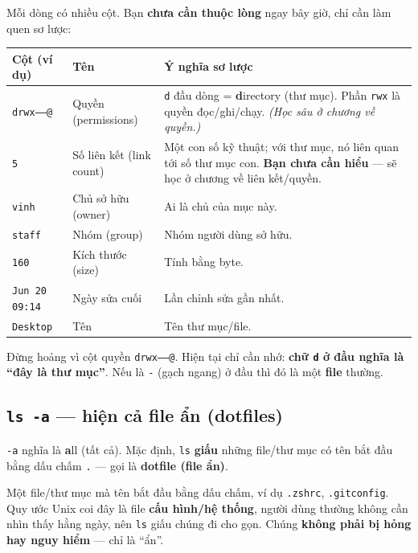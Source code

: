 \documentclass[12pt,a4paper]{article}
\begin{document}
Mỗi dòng có nhiều cột. Bạn \textbf{chưa cần thuộc lòng} ngay bây giờ, chỉ cần làm quen sơ lược:

\renewcommand{\arraystretch}{1.4}
\begin{longtable}{>{\raggedright\arraybackslash}p{2.6cm} >{\raggedright\arraybackslash}p{3.2cm} >{\raggedright\arraybackslash}p{7.6cm}}
\rowcolor{checkback}
\textbf{Cột (ví dụ)} & \textbf{Tên} & \textbf{Ý nghĩa sơ lược} \\
\hline
\endhead
\texttt{drwx------@} & Quyền (permissions) & \texttt{d} đầu dòng = \textbf{d}irectory (thư mục). Phần \texttt{rwx} là quyền đọc/ghi/chạy. \textit{(Học sâu ở chương về quyền.)} \\
\texttt{5} & Số liên kết (link count) & Một con số kỹ thuật; với thư mục, nó liên quan tới số thư mục con. \textbf{Bạn chưa cần hiểu} --- sẽ học ở chương về liên kết/quyền. \\
\texttt{vinh} & Chủ sở hữu (owner) & Ai là chủ của mục này. \\
\texttt{staff} & Nhóm (group) & Nhóm người dùng sở hữu. \\
\texttt{160} & Kích thước (size) & Tính bằng byte. \\
\texttt{Jun 20 09:14} & Ngày sửa cuối & Lần chỉnh sửa gần nhất. \\
\texttt{Desktop} & Tên & Tên thư mục/file. \\
\end{longtable}
\renewcommand{\arraystretch}{1}

\begin{notebox}
Đừng hoảng vì cột quyền \texttt{drwx------@}. Hiện tại chỉ cần nhớ: \textbf{chữ \texttt{d} ở đầu nghĩa là ``đây là thư mục''}. Nếu là \texttt{-} (gạch ngang) ở đầu thì đó là một \textbf{file} thường.
\end{notebox}

\subsection{\texttt{ls -a} --- hiện cả file ẩn (dotfiles)}

\texttt{-a} nghĩa là \textbf{a}ll (tất cả). Mặc định, \texttt{ls} \textbf{giấu} những file/thư mục có tên bắt đầu bằng dấu chấm \texttt{.} --- gọi là \textbf{dotfile (file ẩn)}.

\begin{notebox}[title={Thuật ngữ --- dotfile}]
Một file/thư mục mà tên bắt đầu bằng dấu chấm, ví dụ \texttt{.zshrc}, \texttt{.gitconfig}. Quy ước Unix coi đây là file \textbf{cấu hình/hệ thống}, người dùng thường không cần nhìn thấy hằng ngày, nên \texttt{ls} giấu chúng đi cho gọn. Chúng \textbf{không phải bị hỏng hay nguy hiểm} --- chỉ là ``ẩn''.
\end{notebox}
\end{document}
